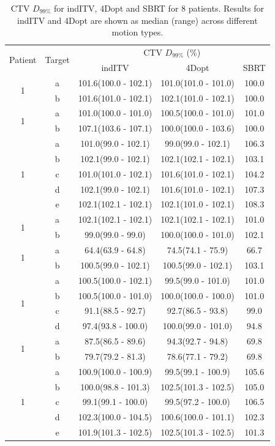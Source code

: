 \begin{table}[H]
	\centering
	\caption{CTV $D_{99\%}$ for indITV, 4Dopt and SBRT for 8 patients. Results for indITV and 4Dopt are shown as median (range) across different motion types.}
	\begin{tabular}{c|c|c|c|c}
		\hline\hline
		\multirow{2}{*}{Patient} & \multirow{2}{*}{Target} & \multicolumn{3}{|c}{CTV $D_{99\%}$ (\%)}  \\
		 &  & indITV & 4Dopt & SBRT \\
		 \hline
		 
\multirow{2}{*}{1} & a & 101.6(100.0 - 102.1) & 101.0(101.0 - 101.0) & 100.0\\ 
 & b & 101.6(101.0 - 102.1) & 102.1(101.0 - 102.1) & 100.0\\ 
 \hline
\multirow{2}{*}{1} & a & 101.0(100.0 - 101.0) & 100.5(100.0 - 101.0) & 101.0\\ 
 & b & 107.1(103.6 - 107.1) & 100.0(100.0 - 103.6) & 100.0\\ 
 \hline
\multirow{5}{*}{1} & a & 101.0(99.0 - 102.1) & 99.0(99.0 - 102.1) & 106.3\\ 
 & b & 102.1(99.0 - 102.1) & 102.1(102.1 - 102.1) & 103.1\\ 
 & c & 101.0(101.0 - 102.1) & 101.6(101.0 - 102.1) & 104.2\\ 
 & d & 102.1(99.0 - 102.1) & 101.6(101.0 - 102.1) & 107.3\\ 
 & e & 102.1(102.1 - 102.1) & 102.1(101.0 - 102.1) & 108.3\\ 
 \hline
\multirow{2}{*}{1} & a & 102.1(102.1 - 102.1) & 102.1(102.1 - 102.1) & 101.0\\ 
 & b & 99.0(99.0 - 99.0) & 100.0(100.0 - 101.0) & 102.1\\ 
 \hline
\multirow{2}{*}{1} & a & 64.4(63.9 - 64.8) & 74.5(74.1 - 75.9) & 66.7\\ 
 & b & 100.5(99.0 - 102.1) & 100.5(99.0 - 102.1) & 103.1\\ 
 \hline
\multirow{4}{*}{1} & a & 100.5(100.0 - 102.1) & 99.5(99.0 - 101.0) & 101.0\\ 
 & b & 100.5(100.0 - 101.0) & 100.0(100.0 - 100.0) & 101.0\\ 
 & c & 91.1(88.5 - 92.7) & 92.7(86.5 - 93.8) & 99.0\\ 
 & d & 97.4(93.8 - 100.0) & 100.0(99.0 - 101.0) & 94.8\\ 
 \hline
\multirow{2}{*}{1} & a & 87.5(86.5 - 89.6) & 94.3(92.7 - 94.8) & 69.8\\ 
 & b & 79.7(79.2 - 81.3) & 78.6(77.1 - 79.2) & 69.8\\ 
 \hline
\multirow{5}{*}{1} & a & 100.9(100.0 - 100.9) & 99.5(99.1 - 100.9) & 105.6\\ 
 & b & 100.0(98.8 - 101.3) & 102.5(101.3 - 102.5) & 105.0\\ 
 & c & 99.1(99.1 - 100.0) & 99.5(97.2 - 100.0) & 106.5\\ 
 & d & 102.3(100.0 - 104.5) & 100.6(100.0 - 101.1) & 102.3\\ 
 & e & 101.9(101.3 - 102.5) & 102.5(101.3 - 102.5) & 101.3\\ 
\hline\hline
	\end{tabular}
	\label{tab:resultsComplex}
\end{table}


